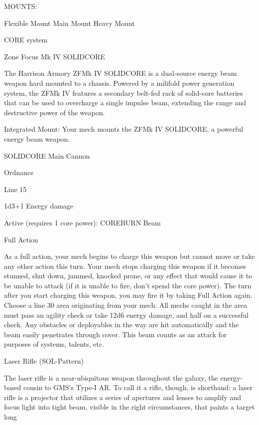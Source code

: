                                                  MOUNTS:

 Flexible Mount                    Main Mount                            Heavy Mount

                                               CORE system




                                       Zone Focus Mk IV  SOLIDCORE

 The Harrison Armory ZFMk IV SOLIDCORE is a dual-source energy beam weapon hard mounted to a
 chassis. Powered by a milifold power generation system, the ZFMk IV features a secondary belt-fed
 rack of solid-core batteries that can be used to overcharge a single impulse beam, extending the range
 and destructive power of the weapon.

  Integrated Mount: Your mech mounts the ZFMk IV SOLIDCORE, a powerful energy beam weapon.

 SOLIDCORE
  Main Cannon

 Ordnance

  Line 15

  1d3+1 Energy damage


 Active (requires 1 core power): COREBURN Beam

  Full Action

 As a full action, your mech begins to charge this weapon but cannot move or take any other action this
 turn. Your mech stops charging this weapon if it becomes stunned, shut down, jammed, knocked
  prone, or any effect that would cause it to be unable to attack (if it is unable to fire, don’t spend the
 core power). The turn after you start charging this weapon, you may fire it by taking Full Action again.
 Choose a line 30 area originating from your mech. All mechs caught in the area must pass an agility
 check or take 12d6 energy damage, and half on a successful check. Any obstacles or deployables in
 the way are hit automatically and the beam easily penetrates through cover. This beam counts as an
 attack for purposes of systems, talents, etc.

Laser Rifle (SOL-Pattern)

The laser rifle is a near-ubiquitous weapon throughout the galaxy, the energy-based cousin to GMS's Type-I
AR. To call it a rifle, though, is shorthand: a laser rifle is a projector that utilizes a series of apertures and
lenses to amplify and focus light into tight beam, visible in the right circumstances, that paints a target long

